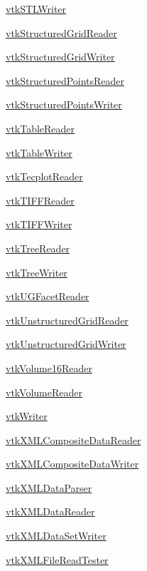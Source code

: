 \begin{DoxyItemize}
\item \hyperlink{vtkio_vtkstlwriter}{vtk\-S\-T\-L\-Writer}  
\item \hyperlink{vtkio_vtkstructuredgridreader}{vtk\-Structured\-Grid\-Reader}  
\item \hyperlink{vtkio_vtkstructuredgridwriter}{vtk\-Structured\-Grid\-Writer}  
\item \hyperlink{vtkio_vtkstructuredpointsreader}{vtk\-Structured\-Points\-Reader}  
\item \hyperlink{vtkio_vtkstructuredpointswriter}{vtk\-Structured\-Points\-Writer}  
\item \hyperlink{vtkio_vtktablereader}{vtk\-Table\-Reader}  
\item \hyperlink{vtkio_vtktablewriter}{vtk\-Table\-Writer}  
\item \hyperlink{vtkio_vtktecplotreader}{vtk\-Tecplot\-Reader}  
\item \hyperlink{vtkio_vtktiffreader}{vtk\-T\-I\-F\-F\-Reader}  
\item \hyperlink{vtkio_vtktiffwriter}{vtk\-T\-I\-F\-F\-Writer}  
\item \hyperlink{vtkio_vtktreereader}{vtk\-Tree\-Reader}  
\item \hyperlink{vtkio_vtktreewriter}{vtk\-Tree\-Writer}  
\item \hyperlink{vtkio_vtkugfacetreader}{vtk\-U\-G\-Facet\-Reader}  
\item \hyperlink{vtkio_vtkunstructuredgridreader}{vtk\-Unstructured\-Grid\-Reader}  
\item \hyperlink{vtkio_vtkunstructuredgridwriter}{vtk\-Unstructured\-Grid\-Writer}  
\item \hyperlink{vtkio_vtkvolume16reader}{vtk\-Volume16\-Reader}  
\item \hyperlink{vtkio_vtkvolumereader}{vtk\-Volume\-Reader}  
\item \hyperlink{vtkio_vtkwriter}{vtk\-Writer}  
\item \hyperlink{vtkio_vtkxmlcompositedatareader}{vtk\-X\-M\-L\-Composite\-Data\-Reader}  
\item \hyperlink{vtkio_vtkxmlcompositedatawriter}{vtk\-X\-M\-L\-Composite\-Data\-Writer}  
\item \hyperlink{vtkio_vtkxmldataparser}{vtk\-X\-M\-L\-Data\-Parser}  
\item \hyperlink{vtkio_vtkxmldatareader}{vtk\-X\-M\-L\-Data\-Reader}  
\item \hyperlink{vtkio_vtkxmldatasetwriter}{vtk\-X\-M\-L\-Data\-Set\-Writer}  
\item \hyperlink{vtkio_vtkxmlfilereadtester}{vtk\-X\-M\-L\-File\-Read\-Tester}  

\end{DoxyItemize}
